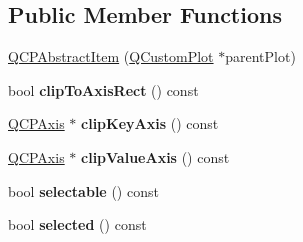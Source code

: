 \subsection*{Public Member Functions}
\begin{DoxyCompactItemize}
\item 
\hyperlink{classQCPAbstractItem_a9922507d8b4503a1fe1ed0b1030e23b6}{Q\-C\-P\-Abstract\-Item} (\hyperlink{classQCustomPlot}{Q\-Custom\-Plot} $\ast$parent\-Plot)
\item 
\hypertarget{classQCPAbstractItem_a5b0ea171823033bcb8aee81f4a034871}{bool {\bfseries clip\-To\-Axis\-Rect} () const }\label{classQCPAbstractItem_a5b0ea171823033bcb8aee81f4a034871}

\item 
\hypertarget{classQCPAbstractItem_aaf1da87df6f5bfed5253b83ddccbee13}{\hyperlink{classQCPAxis}{Q\-C\-P\-Axis} $\ast$ {\bfseries clip\-Key\-Axis} () const }\label{classQCPAbstractItem_aaf1da87df6f5bfed5253b83ddccbee13}

\item 
\hypertarget{classQCPAbstractItem_a24e69c6991839f9267e21a42d38aacf2}{\hyperlink{classQCPAxis}{Q\-C\-P\-Axis} $\ast$ {\bfseries clip\-Value\-Axis} () const }\label{classQCPAbstractItem_a24e69c6991839f9267e21a42d38aacf2}

\item 
\hypertarget{classQCPAbstractItem_a9189e752025533e1595eaade0009a3bc}{bool {\bfseries selectable} () const }\label{classQCPAbstractItem_a9189e752025533e1595eaade0009a3bc}

\item 
\hypertarget{classQCPAbstractItem_a225865808640d8d9a7dd19f09a2e93f2}{bool {\bfseries selected} () const }\label{classQCPAbstractItem_a225865808640d8d9a7dd19f09a2e93f2}


\end{DoxyCompactItemize}
